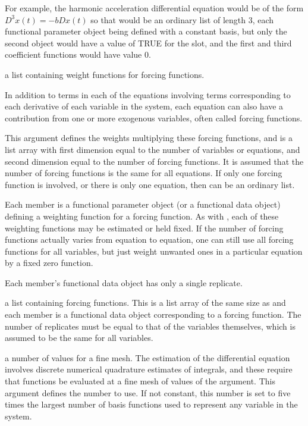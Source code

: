 \documentclass{article}
\begin{document}
\begin{Arguments}
\begin{ldescription}
For example, the harmonic acceleration differential equation
would be of the form $D^3 x(t) = -b Dx(t)$ so that
would be an ordinary list of length 3, each functional parameter object
being defined with a constant basis, but only the second object would
have a value of TRUE for the  slot, and the first
and third coefficient functions would have value 0.

\item[\code{awtlist}] a list containing weight functions for forcing functions.

In addition to terms in each of the equations involving terms corresponding
to each derivative of each variable in the system, each equation can
also have a contribution from one or more exogenous variables, often
called forcing functions.

This argument defines the weights multiplying these
forcing functions, and is a list array with first dimension equal to
the number of variables or equations, and second dimension equal to the
number of forcing functions. It is assumed that the number of forcing functions is
the same for all equations. If only one forcing function is involved,
or there is only one equation, then  can be an
ordinary list.

Each member is a functional parameter object
(or a functional data object) defining a weighting function for a
forcing function.  As with
, each of these weighting functions may be estimated
or held fixed.  If the number of forcing functions actually varies from
equation to equation, one can still use all forcing functions for all
variables, but just weight unwanted ones in a particular equation by a
fixed zero function.

Each member's functional data object has only a single replicate.

\item[\code{ufdlist}] a list containing forcing functions.
This is a list array of the same size as  and each
member is a functional data object corresponding to a forcing function.
The number of replicates must be equal to that of the variables themselves,
which is assumed to be the same for all variables.

\item[\code{nfine}] a number of values for a fine mesh.
The estimation of the differential equation involves discrete
numerical quadrature estimates of integrals, and these require
that functions be evaluated at a fine mesh of values of the
argument.  This argument defines the number to use.  If not
constant, this number is set to five times the largest number of
basis functions used to represent any variable in the system.

\end{ldescription}
\end{Arguments}
\end{document}
